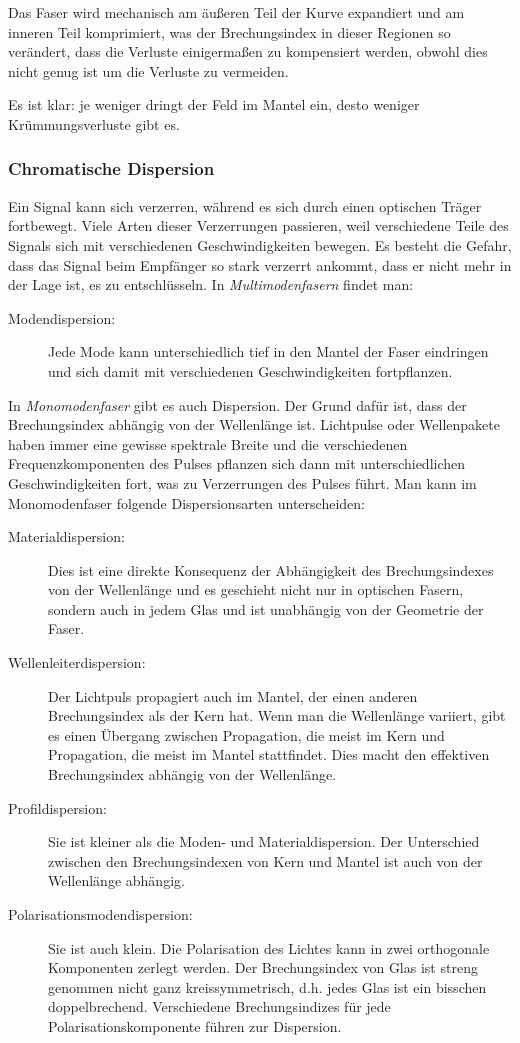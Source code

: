 \documentclass[a4paper]{article}
\begin{document}
Das Faser wird mechanisch am äußeren Teil der Kurve expandiert und am inneren
Teil komprimiert, was der Brechungsindex in dieser Regionen so verändert, dass 
die Verluste einigermaßen zu kompensiert werden, obwohl dies nicht genug ist um
die Verluste zu vermeiden.

Es ist klar: je weniger dringt der Feld im Mantel ein, desto weniger
Krümmungsverluste gibt es. 


\subsubsection{Chromatische Dispersion}
Ein Signal kann sich verzerren, während es sich durch einen optischen
Träger fortbewegt. Viele Arten dieser Verzerrungen passieren, weil
verschiedene Teile des Signals sich mit verschiedenen Geschwindigkeiten
bewegen. Es besteht die Gefahr, dass das Signal beim Empfänger so
stark verzerrt ankommt, dass er nicht mehr in der Lage ist, es zu
entschlüsseln. In \emph{Multimodenfasern} findet man:
\begin{description}
  \item[Modendispersion:] Jede Mode kann unterschiedlich
    tief in den Mantel der Faser eindringen und sich damit mit verschiedenen
    Geschwindigkeiten fortpflanzen.
\end{description} 
In \emph{Monomodenfaser} gibt es auch Dispersion. Der Grund
dafür ist, dass der Brechungsindex abhängig von der Wellenlänge ist.
Lichtpulse oder Wellenpakete haben immer eine gewisse spektrale Breite und die
verschiedenen Frequenzkomponenten des Pulses pflanzen sich dann mit
unterschiedlichen Geschwindigkeiten fort, was zu Verzerrungen des Pulses führt.
Man kann im Monomodenfaser folgende Dispersionsarten unterscheiden:
\begin{description}
  \item[Materialdispersion:] Dies ist eine direkte Konsequenz der
    Abhängigkeit des Brechungsindexes von der  Wellenlänge und es geschieht
    nicht nur in optischen Fasern, sondern auch in jedem Glas und ist unabhängig von
    der Geometrie der Faser.
  \item[Wellenleiterdispersion:] Der Lichtpuls propagiert auch im Mantel,
    der einen anderen Brechungsindex als der Kern hat. Wenn man die
    Wellenlänge variiert, gibt es einen Übergang zwischen Propagation,
    die meist im Kern und Propagation, die meist im Mantel stattfindet.
    Dies macht den effektiven Brechungsindex abhängig von der Wellenlänge.
  \item[Profildispersion:] Sie ist kleiner als die Moden- und
    Materialdispersion. Der Unterschied zwischen den Brechungsindexen von Kern
    und Mantel ist auch von der Wellenlänge abhängig.
  \item[Polarisationsmodendispersion:] Sie ist auch klein. Die Polarisation des
    Lichtes kann in zwei orthogonale Komponenten zerlegt werden. Der
    Brechungsindex von Glas ist streng genommen nicht ganz kreissymmetrisch,
    d.h. jedes Glas ist ein bisschen doppelbrechend. Verschiedene
    Brechungsindizes für jede Polarisationskomponente führen zur Dispersion.
\end{description}
\end{document}
